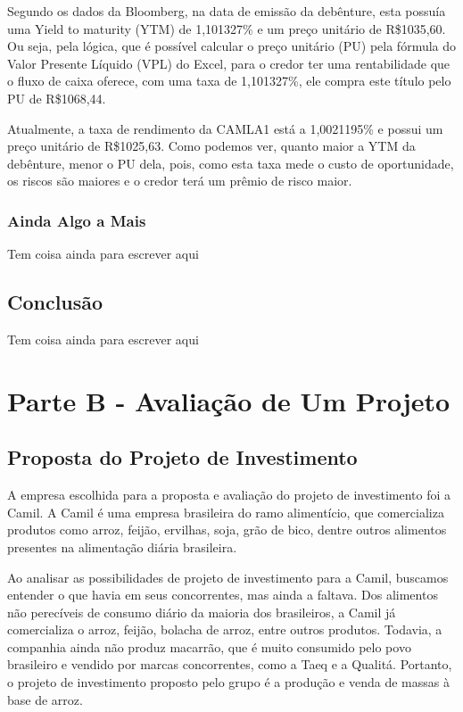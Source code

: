 \documentclass[11pt]{article}
\newcommand{\real}[1]{R\$#1}
\begin{document}
Segundo os dados da Bloomberg, na data de emissão da debênture, esta possuía uma Yield to maturity (YTM) de 1,101327\% e um preço unitário de \real{1035,60}. Ou seja, pela lógica, que é possível calcular o preço unitário (PU) pela fórmula do Valor Presente Líquido (VPL) do Excel, para o credor ter uma rentabilidade que o fluxo de caixa oferece, com uma taxa de 1,101327\%, ele compra este título pelo PU de \real{1068,44}. 

Atualmente, a taxa de rendimento da CAMLA1 está a 1,0021195\% e possui um preço unitário de \real{1025,63}. Como podemos ver, quanto maior a YTM da debênture, menor o PU dela, pois, como esta taxa mede o custo de oportunidade, os riscos são maiores e o credor terá um prêmio de risco maior.


\subsubsection{\textbf{Ainda Algo a Mais}}
Tem coisa ainda para escrever aqui
\subsection{\textbf{Conclusão}}
Tem coisa ainda para escrever aqui
\newpage

\section{\textbf{Parte B - Avaliação de Um Projeto}}
\subsection{\textbf{Proposta do Projeto de Investimento}}
A empresa escolhida para a proposta e avaliação do projeto de investimento foi a Camil. A Camil é uma empresa brasileira do ramo alimentício, que comercializa produtos como arroz, feijão, ervilhas, soja, grão de bico, dentre outros alimentos presentes na alimentação diária brasileira.

Ao analisar as possibilidades de projeto de investimento para a Camil, buscamos entender o que havia em seus concorrentes, mas ainda a faltava. Dos alimentos não perecíveis de consumo diário da maioria dos brasileiros, a Camil já comercializa o arroz, feijão, bolacha de arroz, entre outros produtos. Todavia, a companhia ainda não produz macarrão, que é muito consumido pelo povo brasileiro e vendido por marcas concorrentes, como a Taeq e a Qualitá. Portanto, o projeto de investimento proposto pelo grupo é a produção e venda de massas à base de arroz.
\end{document}
